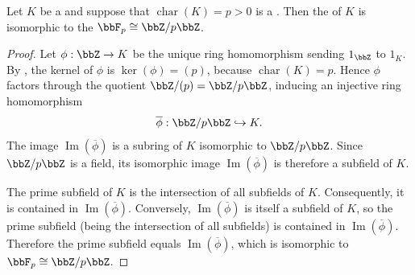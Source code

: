 \begin{proposition} \label{proposition:prime_subfield_of_a_field_of_characteristic_p_is_isomorphic_to_finite_field_F_p}
    Let $K$ be a  and suppose that $\operatorname{char}(K) = p > 0$ is a . Then the  of $K$ is isomorphic to the  $\bbF_p \cong \bbZ/p\bbZ$.
\end{proposition}
\begin{proof}
    Let $\phi : \bbZ \to K$ be the unique ring homomorphism sending $1_\bbZ$ to $1_K$. By , the kernel of $\phi$ is $\operatorname{ker}(\phi) = (p)$, because $\operatorname{char}(K) = p$. Hence $\phi$ factors through the quotient $\bbZ/(p) = \bbZ/p\bbZ$, inducing an injective ring homomorphism
    $$\overline{\phi} : \bbZ/p\bbZ \hookrightarrow K.$$
    The image $\operatorname{Im}(\overline{\phi})$ is a subring of $K$ isomorphic to $\bbZ/p\bbZ$. Since $\bbZ/p\bbZ$ is a field, its isomorphic image $\operatorname{Im}(\overline{\phi})$ is therefore a subfield of $K$.

    The prime subfield of $K$ is the intersection of all subfields of $K$. Consequently, it is contained in $\operatorname{Im}(\overline{\phi})$. Conversely, $\operatorname{Im}(\overline{\phi})$ is itself a subfield of $K$, so the prime subfield (being the intersection of all subfields) is contained in $\operatorname{Im}(\overline{\phi})$. Therefore the prime subfield equals $\operatorname{Im}(\overline{\phi})$, which is isomorphic to $\bbF_p \cong \bbZ/p\bbZ$.
\end{proof}